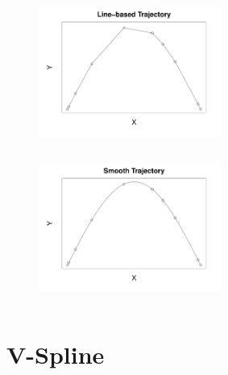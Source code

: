 \documentclass{beamer}
\begin{document}
%
%
\begin{frame}
	
\begin{figure}
\vspace*{1cm}
\centering
\includegraphics[width=6cm,height=5cm]{plots/linetrajectory}
\includegraphics[width=6cm,height=5cm]{plots/smoothtrajectory}
\end{figure}

\end{frame}


\section{V-Spline}
\end{document}
